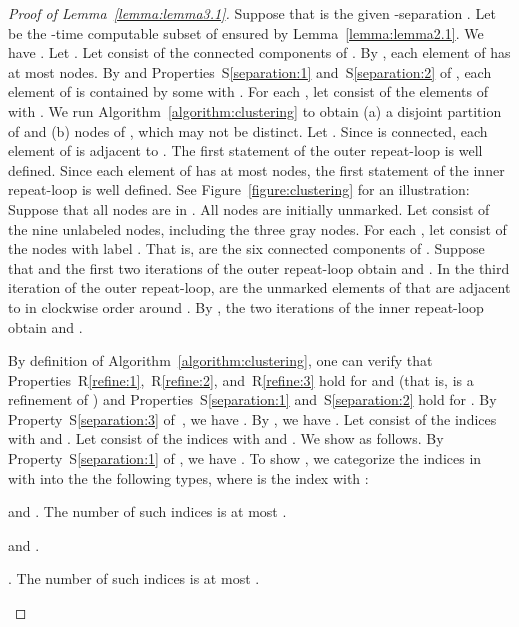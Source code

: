 \documentclass[12pt]{article}
\begin{document}
\begin{proof}[Proof of Lemma~\ref{lemma:lemma3.1}]
Suppose that  is the given -separation
.  Let  be the -time computable subset of
 ensured by Lemma~\ref{lemma:lemma2.1}.  We have
.  Let .  Let 
consist of the connected components of .  By
, each element of  has at most 
nodes.  By  and Properties~S\ref{separation:1}
and~S\ref{separation:2} of , each element of  is
contained by some  with .  For each
, let  consist of the elements  of  with
.  We run Algorithm~\ref{algorithm:clustering} to
obtain (a) a disjoint partition  of 
and (b)  nodes  of , which may not be
distinct. Let .  Since  is connected,
each element of  is adjacent to .  The first statement of the
outer repeat-loop is well defined.  Since each element of  has at
most  nodes, the first statement of the inner repeat-loop is
well defined.  See Figure~\ref{figure:clustering} for an illustration:
Suppose that all nodes are in .  All nodes are initially
unmarked.  Let  consist of the nine unlabeled nodes, including
the three gray nodes.  For each , let  consist of
the nodes with label . That is,  are the six
connected components of . Suppose that 
and the first two iterations of the outer repeat-loop obtain 
and . In the third iteration of the outer repeat-loop,
 are the unmarked elements of  that are adjacent
to  in clockwise order around . By
, the two iterations of the inner repeat-loop
obtain  and .

By definition of Algorithm~\ref{algorithm:clustering}, one can verify
that Properties~R\ref{refine:1},~R\ref{refine:2}, and~R\ref{refine:3}
hold for  and  (that is,  is a refinement
of ) and Properties~S\ref{separation:1}
and~S\ref{separation:2} hold for .  By
Property~S\ref{separation:3} of~, we have
.  By
, we have .  Let  consist of
the indices  with  and .  Let  consist of the
indices  with  and .  We show
 as
follows.  By Property~S\ref{separation:1} of , we have
.  To show
, we categorize the indices
 in  with  into the the following
types, where  is the index with :
\begin{description}
\addtolength{\itemsep}{-0.5\baselineskip}
\item[\rm\em Type 1:]  and .  The number of such indices  is at
  most .

\item[\rm\em Type 2:]  and .
\begin{description}
\addtolength{\itemsep}{-0.2\baselineskip}
\item[\rm\em Type 2a:] .  The number of such
  indices  is at most
  .


\end{description}
\end{description}
\end{proof}
\end{document}

